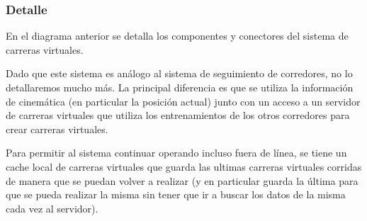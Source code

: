 
\subsubsection{Detalle}

En el diagrama anterior se detalla los componentes y conectores del
sistema de carreras virtuales.

Dado que este sistema es análogo al sistema de seguimiento de
corredores, no lo detallaremos mucho más. La principal diferencia es
que se utiliza la información de cinemática (en particular la posición
actual) junto con un acceso a un servidor de carreras virtuales que
utiliza los entrenamientos de los otros corredores para crear carreras
virtuales.

Para permitir al sistema continuar operando incluso fuera de línea, se
tiene un cache local de carreras virtuales que guarda las ultimas
carreras virtuales corridas de manera que se puedan volver a realizar
(y en particular guarda la última para que se pueda realizar la misma
sin tener que ir a buscar los datos de la misma cada vez al servidor).

